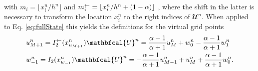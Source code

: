 with $m_i = \lfloor x_i^n/h^n\rfloor$ and $m_i^\leftarrow = \lfloor x_i^n/ h^n+(1-\alpha) \rfloor$ , where the shift in the latter is necessary to transform the location $x_i^n$ to the right indices of $\mathbfcal{U}^n$.
When applied to Eq. \eqref{eq:fullState} this yields the definitions for the virtual grid points
\begin{subequations}\label{eq:connectionInterpol}
\begin{align}
        &u_{M+1}^n = I_2^\flip(x^n_{u_{M+1}})\mathbfcal{U}^n = \frac{\alpha - 1}{\alpha + 1}u_{M}^n + w_0^n - \frac{\alpha - 1}{\alpha + 1}w_1^n
    \label{eq:calcUMP1}\\
        &w_{-1}^n = I_2(x^n_{w_{-1}})\mathbfcal{U}^n
        =-\frac{\alpha - 1}{\alpha + 1}u_{M-1}^n + u_{M}^n+ \frac{\alpha - 1}{\alpha + 1}w_{0}^n.\label{eq:calcWM1}
\end{align}
\end{subequations}
